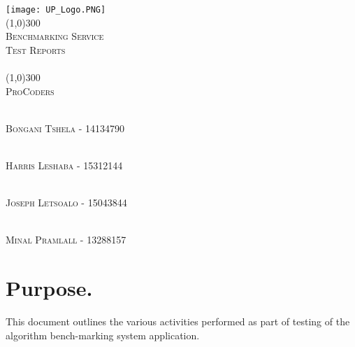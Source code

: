 \documentclass[runningheads,a4paper]{article}
\begin{document}
	
\begin{titlepage}
	\begin{center}
		\texttt{[image: UP\_Logo.PNG]}  \\
		[1cm]
		\line(1,0){300} \\
		[0.3cm]
		\textsc{\Large
			Benchmarking Service\\
			Test Reports\\
			\hfill
		}\\
		[0.1cm]
		\line(1,0){300} \\
		[0.7cm]
		\textsc{\Large
			ProCoders
		} \\
	\end{center}
	
	\begin{center}
		\begin{centre}
			\textsc{\large\\
				Bongani Tshela - 14134790\\ 
			}
		
			\textsc{\large\\
				Harris Leshaba - 15312144\\ 
			}

			\textsc{\large\\
				Joseph Letsoalo - 15043844\\ 
			}
			
			\textsc{\large\\
				Minal Pramlall - 13288157\\ 
			}
			
		

            

		\end{centre}
		
		
		
	\end{center}
\end{titlepage}

\begingroup

\tableofcontents
{}
\endgroup
\newpage

\section{Purpose.}
\raggedright{
This document outlines the various activities performed as part of testing of the algorithm bench-marking system application.
}
\end{document}
